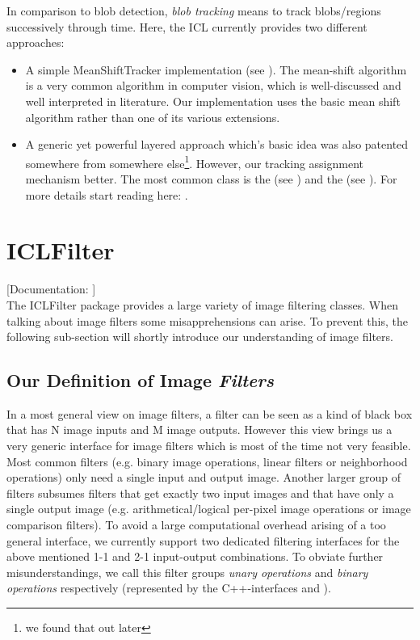 In comparison to blob detection, \emph{blob tracking} means to track blobs/regions successively through time. Here, the ICL currently provides two different approaches: 
\begin{itemize}
\item A simple MeanShiftTracker implementation (see ). The mean-shift algorithm is a very common algorithm in computer vision, which is well-discussed and well interpreted in literature. Our implementation uses the basic mean shift algorithm rather than one of its various extensions.
\item A generic yet powerful layered approach which's basic idea was also patented somewhere from somewhere else\footnote{we found that out later}. However, our tracking assignment mechanism better. The most common class is the  (see ) and the  (see ). For more details start reading here: .
\end{itemize}


\section{ICLFilter\label{sec:filter}}

[Documentation: ]\\

The ICLFilter package provides a large variety of image filtering classes. When talking about image filters some misapprehensions can arise. To prevent this, the following sub-section will shortly introduce our understanding of image filters.

\subsection{Our Definition of Image \emph{Filters}}

In a most general view on image filters, a filter can be seen as a kind of black box that has N image inputs and M image outputs. However this view brings us a very generic interface for image filters which is most of the time not very feasible. \\
Most common filters (e.g. binary image operations, linear filters or neighborhood operations) only need a single input and output image. Another larger group of filters subsumes filters that get exactly two input images and that have only a single output image (e.g. arithmetical/logical per-pixel image operations or image comparison filters).
To avoid a large computational overhead arising of a too general interface, we currently support two dedicated filtering interfaces for the above mentioned 1-1 and 2-1 input-output combinations. To obviate further misunderstandings, we call this filter groups \emph{unary operations} and \emph{binary operations} respectively (represented by the C++-interfaces  and ).

